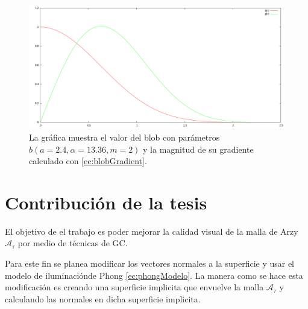 \begin{figure}[htp]
 \centering
  \includegraphics[scale=0.3]{img/cap02/BlobGradien}
  \caption[Comparación entre el blob y su gradiente]{La gráfica muestra el valor del blob con parámetros $b(a = 2.4, \alpha = 13.36, m = 2)$ y la magnitud de su gradiente calculado con \eqref{ec:blobGradient}.}
  \label{fig:gradientValueComparision}
\end{figure}


% 
% 
\section{Contribución de la tesis}
El objetivo de el trabajo es poder mejorar la calidad visual de la malla de Arzy $\mathcal{A}_{\tau}$ por medio de técnicas de GC. 

Para este fin se planea modificar los vectores normales a la superficie y usar el modelo de iluminaciónde Phong \ref{ec:phongModelo}. La manera como se hace esta modificación es creando una superficie implicita que envuelve la malla $\mathcal{A}_{\tau}$ y calculando las normales en dicha superficie implicita.

